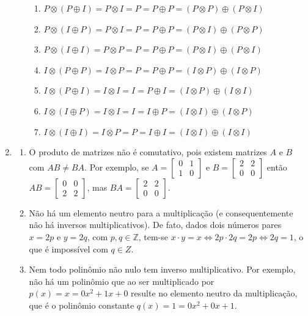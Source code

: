 \documentclass[12pt,a4paper]{article}
\newcommand*\Z{\mathbb{Z}}
\begin{document}
\begin{enumerate}
\begin{enumerate}
\begin{enumerate}
\item $P \otimes (P \oplus I) = P \otimes I = P = P \oplus P = (P \otimes P) \oplus (P \otimes I)$
\item $P \otimes (I \oplus P) = P \otimes I = P = P \oplus P = (P \otimes I) \oplus (P \otimes P)$
\item $P \otimes (I \oplus I) = P \otimes P = P = P \oplus P = (P \otimes I) \oplus (P \otimes I)$
\item $I \otimes (P \oplus P) = I \otimes P = P = P \oplus P = (I \otimes P) \oplus (I \otimes P)$
\item $I \otimes (P \oplus I) = I \otimes I = I = P \oplus I = (I \otimes P) \oplus (I \otimes I)$
\item $I \otimes (I \oplus P) = I \otimes I = I = I \oplus P = (I \otimes I) \oplus (I \otimes P)$
\item $I \otimes (I \oplus I) = I \otimes P = P = I \oplus I = (I \otimes I) \oplus (I \otimes I)$
\end{enumerate}
\end{enumerate}
\item
\begin{enumerate}
\item O produto de matrizes não é comutativo, pois existem matrizes $A$ e $B$ com $AB \neq BA$. Por exemplo, se $A=\begin{bmatrix} 0 & 1 \\ 1 & 0 \end{bmatrix}$ e $B =\begin{bmatrix} 2 & 2 \\ 0 & 0 \end{bmatrix}$ então $AB = \begin{bmatrix} 0 & 0 \\ 2 & 2 \end{bmatrix}$, mas $BA = \begin{bmatrix} 2 & 2 \\ 0 & 0 \end{bmatrix}$.
\item Não há um elemento neutro para a multiplicação (e consequentemente não há inversos multiplicativos). De fato, dados dois números pares $x=2p$ e $y=2q$, com $p,q \in \Z$, tem-se $x \cdot y=x \Leftrightarrow 2p \cdot 2q = 2p \Leftrightarrow 2q = 1$, o que é impossível com $q \in Z$.
\item Nem todo polinômio não nulo tem inverso multiplicativo. Por exemplo, não há um polinômio que ao ser multiplicado por $p(x) = x = 0x^2 + 1x + 0$ resulte no elemento neutro da multiplicação, que é o polinômio constante $q(x) = 1 = 0x^2+0x+1$.
\end{enumerate}


\end{enumerate}
\end{document}
